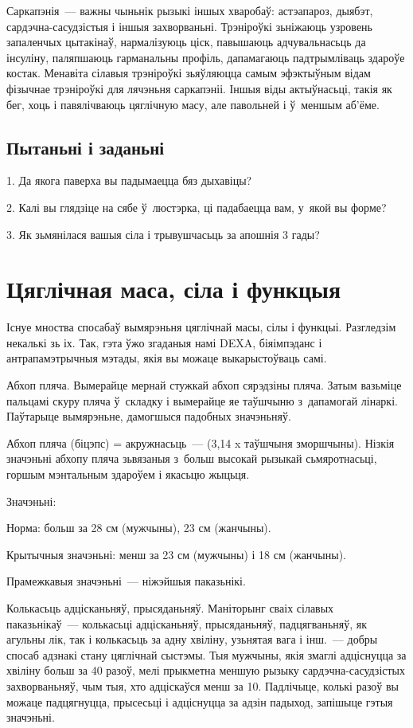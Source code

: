 Саркапэнія~--- важны чыньнік рызыкі іншых хваробаў: астэапароз, дыябэт, сардэчна-сасудзістыя і іншыя захворваньні. Трэніроўкі зьніжаюць узровень запаленчых цытакінаў, нармалізуюць ціск, павышаюць адчувальнасьць да інсуліну, паляпшаюць гарманальны профіль, дапамагаюць падтрымліваць здароўе костак. Менавіта сілавыя трэніроўкі зьяўляюцца самым эфэктыўным відам фізычнае трэніроўкі для лячэньня саркапэніі. Іншыя віды актыўнасьці, такія як бег, хоць і павялічваюць цяглічную масу, але павольней і ў~меншым аб'ёме.

\subsection*{Пытаньні і заданьні}

1. Да якога паверха вы падымаецца бяз дыхавіцы?

2. Калі вы глядзіце на сябе ў~люстэрка, ці падабаецца вам, у~якой вы форме?

3. Як зьмянілася вашыя сіла і трывушчасьць за апошнія 3 гады?


\section{Цяглічная маса, сіла і функцыя}

Існуе мноства спосабаў вымярэньня цяглічнай масы, сілы і функцыі. Разгледзім некалькі зь іх. Так, гэта ўжо згаданыя намі DEXA, біяімпэданс і антрапамэтрычныя мэтады, якія вы можаце выкарыстоўваць самі.

Абхоп пляча. Вымерайце мернай стужкай абхоп сярэдзіны пляча. Затым вазьміце пальцамі скуру пляча ў~складку і вымерайце яе таўшчыню з~дапамогай лінаркі. Паўтарыце вымярэньне, дамогшыся падобных значэньняў. 

Абхоп пляча (біцэпс) = акружнасьць~--- (3,14 x таўшчыня зморшчыны). Нізкія значэньні абхопу пляча зьвязаныя з~больш высокай рызыкай сьмяротнасьці, горшым мэнтальным здароўем і якасьцю жыцьця.

Значэньні: 

Норма: больш за 28 см (мужчыны), 23 см (жанчыны). 

Крытычныя значэньні: менш за 23 см (мужчыны) і 18 см (жанчыны). 

Прамежкавыя значэньні~--- ніжэйшыя паказьнікі.

Колькасьць адцісканьняў, прысяданьняў. Маніторынг сваіх сілавых паказьнікаў~--- колькасьці адцісканьняў, прысяданьняў, падцягваньняў, як агульны лік, так і колькасьць за адну хвіліну, узьнятая вага і інш.~--- добры спосаб адзнакі стану цяглічнай сыстэмы. Тыя мужчыны, якія змаглі адціснуцца за хвіліну больш за 40 разоў, мелі прыкметна меншую рызыку сардэчна-сасудзістых захворваньняў, чым тыя, хто адціскаўся менш за 10. Падлічыце, колькі разоў вы можаце падцягнуцца, прысесьці і адціснуцца за адзін падыход, запішыце гэтыя значэньні. 

